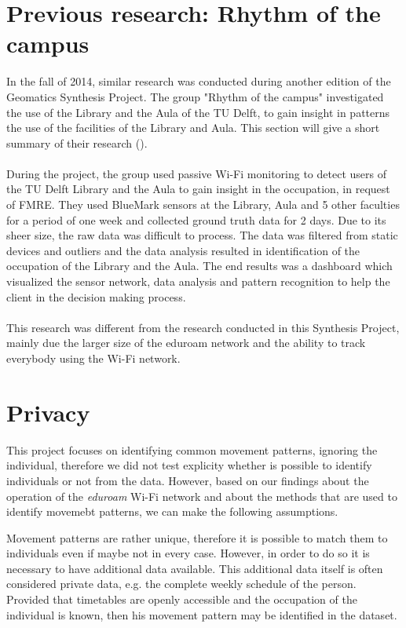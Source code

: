 \section{Previous research: Rhythm of the campus}
In the fall of 2014, similar research was conducted during another edition of the Geomatics Synthesis Project. The group "Rhythm of the campus" investigated the use of the Library and the Aula of the TU Delft, to gain insight in patterns the use of the facilities of the Library and Aula. This section will give a short summary of their research (\cite{rhythmofthecampus}).\\\\
During the project, the group used passive Wi-Fi monitoring to detect users of the TU Delft Library and the Aula to gain insight in the occupation, in request of FMRE. They used BlueMark sensors at the Library, Aula and 5 other faculties for a period of one week and collected ground truth data for 2 days. Due to its sheer size, the raw data was difficult to process. The data was filtered from static devices and outliers and the data analysis resulted in identification of the occupation of the Library and the Aula. The end results was a dashboard which visualized the sensor network, data analysis and pattern recognition to help the client in the decision making process.\\\\
This research was different from the research conducted in this Synthesis Project, mainly due the larger size of the eduroam network and the ability to track everybody using the Wi-Fi network.

\section{Privacy}
This project focuses on identifying common movement patterns, ignoring
the individual, therefore we did not test explicity whether is possible to
identify individuals or not from the data. However, based on our findings about
the operation of the \textit{eduroam} Wi-Fi network and about the methods that
are used to identify movemebt patterns, we can make the following assumptions.

Movement patterns are rather unique, therefore it is possible to match them to
individuals even if maybe not in every case. However, in order to do so it is
necessary to have additional data available. This additional data itself is
often considered private data, e.g. the complete weekly schedule of the person.
Provided that timetables are openly accessible and the occupation of the
individual is known, then his movement pattern may be identified in the dataset.

